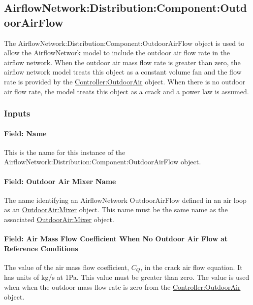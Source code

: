 \subsection{AirflowNetwork:Distribution:Component:OutdoorAirFlow}\label{airflowNetworkdistributioncomponentoutdoorairflow}

The AirflowNetwork:Distribution:Component:OutdoorAirFlow object is used to allow the AirflowNetwork model to include the outdoor air flow rate in the airflow network. When the outdoor air mass flow rate is greater than zero, the airflow network model treats this object as a constant volume fan and the flow rate is provided by the \hyperref[controlleroutdoorair]{Controller:OutdoorAir} object. When there is no outdoor air flow rate, the model treats this object as a crack and a power law is assumed.

\subsubsection{Inputs}\label{inputs-AFN-outdoorairflow}

\paragraph{Field: Name}\label{field-name-outdoorairflow}

This is the name for this instance of the AirflowNetwork:Distribution:Component:OutdoorAirFlow object.

\paragraph{Field: Outdoor Air Mixer Name}

The name identifying an AirflowNetwork OutdoorAirFlow defined in an air loop as an \hyperref[outdoorairmixer]{OutdoorAir:Mixer} object. This name must be the same name as the associated \hyperref[outdoorairmixer]{OutdoorAir:Mixer} object.

\paragraph{Field: Air Mass Flow Coefficient When No Outdoor Air Flow at Reference Conditions}\label{field-air-mass-flow-coefficient-when-no-outdoor-air-flow-at-reference-conditions}

The value of the air mass flow coefficient, \({C_Q}\), in the crack air flow equation. It has units of kg/s at 1Pa. This value must be greater than zero. The value is used when when the outdoor mass flow rate is zero from the \hyperref[controlleroutdoorair]{Controller:OutdoorAir} object.

